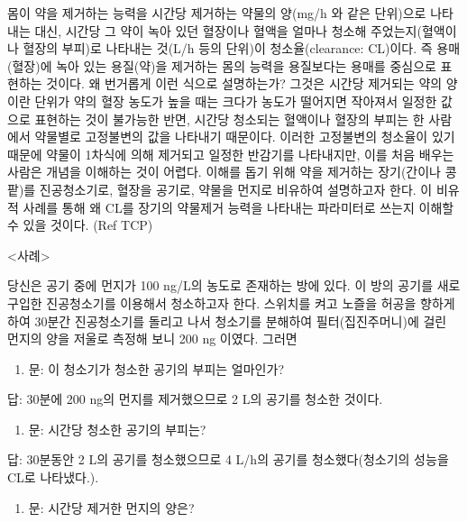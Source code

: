 \documentclass[
  11pt,
  krantz2, a4paper, twoside]{krantz}
\providecommand{\tightlist}{%
  \setlength{\itemsep}{0pt}\setlength{\parskip}{0pt}}
\renewenvironment{quote}{\begin{VF}}{\end{VF}}
\begin{document}
몸이 약을 제거하는 능력을 시간당 제거하는 약물의 양(mg/h 와 같은
단위)으로 나타내는 대신, 시간당 그 약이 녹아 있던 혈장이나 혈액을 얼마나
청소해 주었는지(혈액이나 혈장의 부피)로 나타내는 것(L/h 등의 단위)이
청소율(clearance: CL)이다. 즉 용매(혈장)에 녹아 있는 용질(약)을 제거하는
몸의 능력을 용질보다는 용매를 중심으로 표현하는 것이다. 왜 번거롭게 이런
식으로 설명하는가? 그것은 시간당 제거되는 약의 양이란 단위가 약의 혈장
농도가 높을 때는 크다가 농도가 떨어지면 작아져서 일정한 값으로 표현하는
것이 불가능한 반면, 시간당 청소되는 혈액이나 혈장의 부피는 한 사람에서
약물별로 고정불변의 값을 나타내기 때문이다. 이러한 고정불변의 청소율이
있기 때문에 약물이 1차식에 의해 제거되고 일정한 반감기를 나타내지만,
이를 처음 배우는 사람은 개념을 이해하는 것이 어렵다. 이해를 돕기 위해
약을 제거하는 장기(간이나 콩팥)를 진공청소기로, 혈장을 공기로, 약물을
먼지로 비유하여 설명하고자 한다. 이 비유적 사례를 통해 왜 CL를 장기의
약물제거 능력을 나타내는 파라미터로 쓰는지 이해할 수 있을 것이다. (Ref
TCP)

\textless 사례\textgreater{}

당신은 공기 중에 먼지가 100 ng/L의 농도로 존재하는 방에 있다. 이 방의
공기를 새로 구입한 진공청소기를 이용해서 청소하고자 한다. 스위치를 켜고
노즐을 허공을 향하게 하여 30분간 진공청소기를 돌리고 나서 청소기를
분해하여 필터(집진주머니)에 걸린 먼지의 양을 저울로 측정해 보니 200 ng
이였다. 그러면

\begin{enumerate}
\def\labelenumi{\arabic{enumi})}
\tightlist
\item
  문: 이 청소기가 청소한 공기의 부피는 얼마인가?
\end{enumerate}

\begin{quote}
답: 30분에 200 ng의 먼지를 제거했으므로 2 L의 공기를 청소한 것이다.
\end{quote}

\begin{enumerate}
\def\labelenumi{\arabic{enumi})}
\setcounter{enumi}{1}
\tightlist
\item
  문: 시간당 청소한 공기의 부피는?
\end{enumerate}

\begin{quote}
답: 30분동안 2 L의 공기를 청소했으므로 4 L/h의 공기를
청소했다(청소기의 성능을 CL로 나타냈다.).
\end{quote}

\begin{enumerate}
\def\labelenumi{\arabic{enumi})}
\setcounter{enumi}{2}
\tightlist
\item
  문: 시간당 제거한 먼지의 양은?
\end{enumerate}
\end{document}
